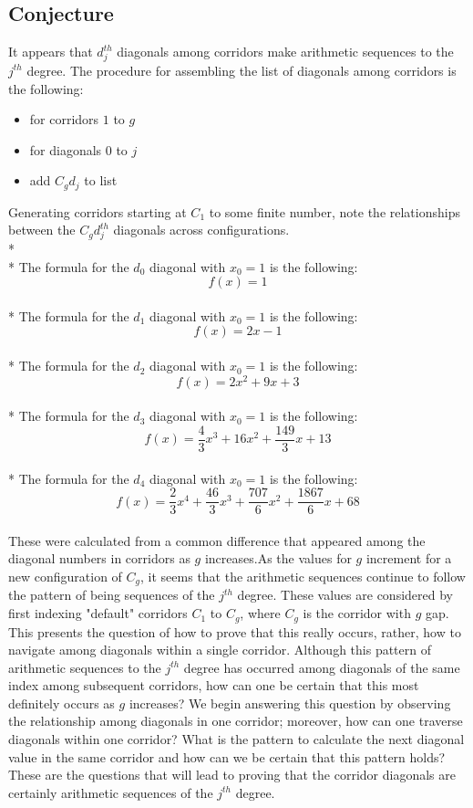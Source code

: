 \documentclass{article}
\newcommand\tab[1][1cm]{\hspace*{#1}}
\begin{document}
 
 \subsection*{Conjecture}
 It appears that $d_j^{th}$ diagonals among corridors 
 make arithmetic sequences to the $j^{th}$ degree. The procedure for assembling the list of diagonals among corridors is the following: 
\begin{itemize}
\item[] for corridors $1$ to $g$
\item[] \tab for diagonals $0$ to $j$
\item[] \tab \tab add $C_gd_j$ to list
\end{itemize} 
Generating corridors starting at $C_1$ to some finite number, note the relationships between the $C_gd_j^{th}$ diagonals across configurations. \\*\\*
The formula for the $d_0$ diagonal with $x_0 = 1$ is the following: \[f(x) = 1\]\\*
The formula for the $d_1$ diagonal with $x_0 = 1$ is the following: \[f(x) = 2x - 1\]\\*
The formula for the $d_2$ diagonal with $x_0 = 1$ is the following: \[f(x) = 2x^2+9x+3\]\\*
The formula for the $d_3$ diagonal with $x_0 = 1$ is the following:  \[f(x) = \frac{4}{3}x^3+16x^2+\frac{149}{3}x+13\]\\*
The formula for the $d_4$ diagonal with $x_0 = 1$ is the following:  \[f(x) = \frac{2}{3}x^4+\frac{46}{3}x^3+\frac{707}{6}x^2+\frac{1867}{6}x+68\]\\
\tab These were calculated from a common difference that appeared among the diagonal numbers in corridors as $g$ increases.As the values for $g$ increment for a new configuration of $C_g$, it seems that the 
arithmetic sequences continue to follow the pattern of being sequences of the $j^{th}$ degree.
These values are considered by first indexing "default" corridors $C_1$ to $C_g$, where $C_g$ is the corridor with $g$ gap. This presents the question of how to prove that this really occurs, rather, how to navigate among 
diagonals within a single corridor. Although this pattern of arithmetic sequences to the $j^{th}$ degree has occurred among diagonals of the same index
among subsequent corridors, how can one be certain that this most definitely occurs as $g$ increases? We begin answering this question by observing the 
relationship among diagonals in one corridor; moreover, how can one traverse diagonals within one corridor? What is the pattern to calculate the next diagonal 
value in the same corridor and how can we be certain that this pattern holds? These are the questions that will lead to proving that the corridor diagonals are
certainly arithmetic sequences of the $j^{th}$ degree.
\end{document}
